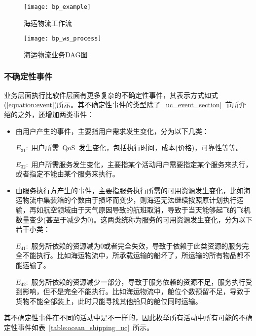 \begin{figure}[htbp]
    \centering
    \texttt{[image: bp\_example]}
    \caption{海运物流工作流}\label{figure:bp_example}
    \vspace{-1em}
\end{figure}

\begin{figure}[htbp]
    \centering
    \texttt{[image: bp\_ws\_process]}
    \caption{海运物流业务DAG图}\label{figure:bp_ws_process}
    \vspace{-1em}
\end{figure}

\subsubsection{不确定性事件}

业务层面执行比软件层面有更多复杂的不确定性事件，其表示方式如式(\ref{equation:event})所示。其不确定性事件的类型除了~\ref{uc_event_section}~节所介绍的之外，还增加两类事件：

\begin{itemize}
    
    \item 由用户产生的事件，主要指用户需求发生变化，分为以下几类：
    
    $E_{31}$:~用户所需~QoS~发生变化，包括执行时间，成本(价格)，可靠性等等。
    
    $E_{32}$:~用户所需服务发生变化，主要指某个活动用户需要指定某个服务来执行，或者指定不能由某个服务来执行。
    
    \item 由服务执行方产生的事件，主要指服务执行所需的可用资源发生变化，比如海运物流中集装箱的个数由于损坏而变少，则海运无法继续按照原计划执行运输，再如航空领域由于天气原因导致的航班取消，导致于当天能够起飞的飞机数量变少(甚至于减少为0)。这两类统称为服务的可用资源发生变化，分为以下若干小类：
    
    $E_{41}$:~服务所依赖的资源减为0或者完全失效，导致于依赖于此类资源的服务完全不能执行。比如海运物流中，所承载运输的船坏了，所运输的所有物品都不能运输了。
    
    $E_{42}$:~服务所依赖的资源减少一部分，导致于服务依赖的资源不足，服务执行受到影响，但不是完全不能执行。比如海运物流中，舱位个数预留不足，导致于货物不能全部装上，此时只能寻找其他船只的舱位同时运输。
    
    
\end{itemize}

其不确定性事件在不同的活动中是不一样的，因此枚举所有活动中所有可能的不确定性事件如表~\ref{table:ocean_shipping_uc}~所示。

